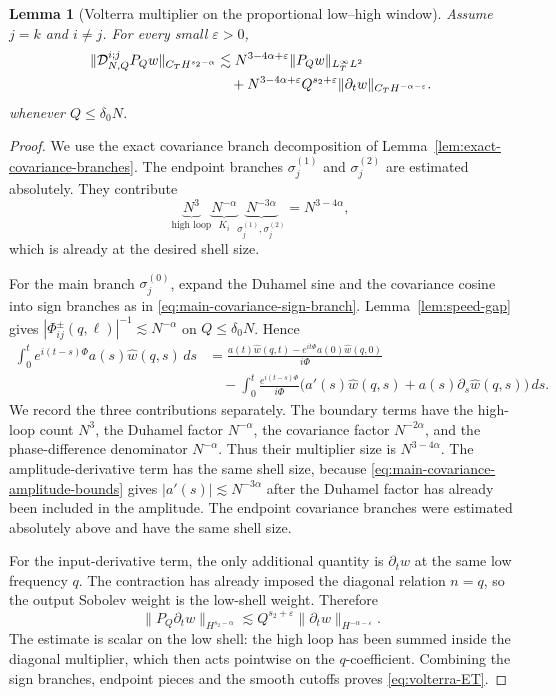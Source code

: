 \documentclass[10pt]{amsart}
\numberwithin{equation}{section}
\theoremstyle{plain}
\newtheorem{lemma}[theorem]{Lemma}
\theoremstyle{definition}
\theoremstyle{remark}
\newcommand{\eps}{\varepsilon}
\begin{document}
\begin{lemma}[Volterra multiplier on the proportional low--high window]\label{lem:volterra-ET}
Assume $j=k$ and $i\ne j$.  For every small $\eps>0$,
\begin{align}\label{eq:volterra-ET}
\|\mathcal D_{N,Q}^{i;j}P_Qw\|_{C_TH^{s_2-\alpha}}
&\lesssim
N^{3-4\alpha+\eps}\|P_Qw\|_{L_T^\infty L^2}\notag\\
&\quad+N^{3-4\alpha+\eps}Q^{s_2+\eps}\|\partial_tw\|_{C_TH^{-\alpha-\eps}}.
\end{align}
whenever $Q\le\delta_0N$.
\end{lemma}

\begin{proof}
We use the exact covariance branch decomposition of Lemma~\ref{lem:exact-covariance-branches}.  The endpoint branches $\sigma_j^{(1)}$ and $\sigma_j^{(2)}$ are estimated absolutely.  They contribute
\[
        \underbrace{N^3}_{\text{high loop}}
        \underbrace{N^{-\alpha}}_{K_i}
        \underbrace{N^{-3\alpha}}_{\sigma_j^{(1)},\sigma_j^{(2)}}
        =N^{3-4\alpha},
\]
which is already at the desired shell size.

For the main branch $\sigma_j^{(0)}$, expand the Duhamel sine and the covariance cosine into sign branches as in \eqref{eq:main-covariance-sign-branch}.  Lemma~\ref{lem:speed-gap} gives $|\Phi_{ij}^{\pm}(q,\ell)|^{-1}\lesssim N^{-\alpha}$ on $Q\le\delta_0N$.  Hence
\begin{align*}
\int_0^t e^{i(t-s)\Phi}a(s)\widehat w(q,s)\,ds
&=\frac{a(t)\widehat w(q,t)-e^{it\Phi}a(0)\widehat w(q,0)}{i\Phi}\\
&\quad -\int_0^t\frac{e^{i(t-s)\Phi}}{i\Phi}
       \bigl(a'(s)\widehat w(q,s)+a(s)\partial_s\widehat w(q,s)\bigr)\,ds.
\end{align*}
We record the three contributions separately.  The boundary terms have the high-loop count $N^3$, the Duhamel factor $N^{-\alpha}$, the covariance factor $N^{-2\alpha}$, and the phase-difference denominator $N^{-\alpha}$.  Thus their multiplier size is $N^{3-4\alpha}$.  The amplitude-derivative term has the same shell size, because \eqref{eq:main-covariance-amplitude-bounds} gives $|a'(s)|\lesssim N^{-3\alpha}$ after the Duhamel factor has already been included in the amplitude.  The endpoint covariance branches were estimated absolutely above and have the same shell size.

For the input-derivative term, the only additional quantity is $\partial_tw$ at the same low frequency $q$.  The contraction has already imposed the diagonal relation $n=q$, so the output Sobolev weight is the low-shell weight.  Therefore
\[
\|P_Q\partial_tw\|_{H^{s_2-\alpha}}
\lesssim Q^{s_2+\eps}\|\partial_tw\|_{H^{-\alpha-\eps}}.
\]
The estimate is scalar on the low shell: the high loop has been summed inside the diagonal multiplier, which then acts pointwise on the $q$-coefficient.  Combining the sign branches, endpoint pieces and the smooth cutoffs proves \eqref{eq:volterra-ET}.
\end{proof}
\end{document}
